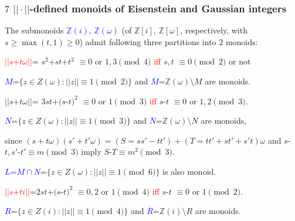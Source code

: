 \documentclass{beamer}
\begin{document}
\begin{frame}\frametitle{$7$ $||\cdot||$-defined monoids of Eisenstein and Gaussian integers}
\vspace{-1mm}

The submonoids 
\textcolor{blue}{$\mathbb{Z}(i)$}, \textcolor{blue}{$\mathbb{Z}(\omega)$}  
 (of  $\mathbb{Z}[i]$,
$\mathbb{Z}[\omega]$, 
respectively,   
with $s\ge \max (t,1) \ge 0$)
admit following three
partitions into $2$ monoids:              
\vspace{1mm}


\textcolor{red}{$||s$+$t\omega||$}=
$s^2$+$st$+$t^2$
$\equiv $$ 0$ or $1,3$$\pmod4$ \textcolor{red}{iff} $s,t$ $\equiv $$0$$\pmod2$ or not

\textcolor{blue}{$M$}=$\{z\in Z(\omega): ||z||\equiv 1\pmod 2\}$ and \textcolor{blue}{$\overline{M}$}=$\mathbb{Z}(\omega)$$\setminus $$M$ are monoids.
\vspace{1mm}
 
$||s$+$t\omega||$=
$3st$+$(s$-$t)^2$ $\equiv $$ 0$ or $1$$\pmod3$ \textcolor{red}{iff} $s$-$t$ $\equiv $$0$ or $1,2$$\pmod3$.

\textcolor{blue}{$N$}=$\{z\in Z(\omega): ||z||\equiv 1 \pmod 3\}$ and \textcolor{blue}{$\overline{N}$}=$\mathbb{Z}(\omega)$$\setminus $$N$ are monoids,

since $(s+t\omega)(s'+t'\omega)=(S=ss'-tt')+(T=tt'+st'+s't)\omega$
and $s$-$t, s'$-$t'\equiv m \pmod3$ imply  $S$-$T\equiv m^2 \pmod3$.
\vspace{1mm}

\textcolor{blue}{$L$=$M\cap N$}=$\{z\in Z(\omega): ||z||\equiv 1 \pmod 6\}$ is also monoid.
\vspace{2mm}

\textcolor{red}{$||s$+$ti||$}=$2st$+$(s$-$t)^2$ $\equiv $$0,2$ or $1$$\pmod4$ \textcolor{red}{iff} $s$-$t$ $\equiv $$0$ or $1$$\pmod2$.





\textcolor{blue}{$R$}=$\{z\in Z(i): ||z||\equiv 1 \pmod 4\}$ and \textcolor{blue}{$\overline{R}$}=$\mathbb{Z}(i)$$\setminus $$R$ are monoids.


\end{frame}
\end{document}
